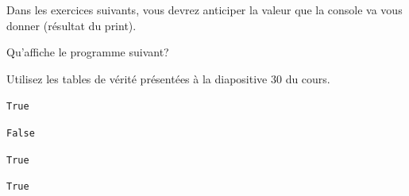     
    

        
 Dans les exercices suivants, vous devrez anticiper la valeur que la console va vous donner (résultat du print). \\


    
%     

        
        
        
        
    
\begin{Exercice}[5 minutes] Qu'affiche le programme suivant?

    \begin{conseil}
	Utilisez les tables de vérité présentées à la diapositive 30 du cours.
\end{conseil}
    
    

    \begin{solution}
        \texttt{True} 
        
        \texttt{False} 
        
        \texttt{True} 
        
        \texttt{True}
    \end{solution}
    
\end{Exercice}
    
